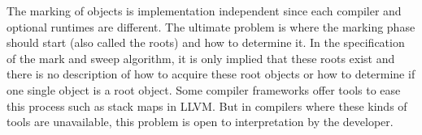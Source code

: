The marking of objects is implementation independent since each compiler and optional runtimes
are different. The ultimate problem is where the marking phase should start (also called
the roots) and how to determine it. In the specification of the mark and sweep algorithm, it is
only implied that these roots exist and there is no description of how to acquire these root
objects or how to determine if one single object is a root object.\cite[p.~19]{gcollHandbook}
Some compiler frameworks offer tools to ease this process such as stack maps in
LLVM.\cite{llvmStackMaps} But in compilers where these kinds of tools are unavailable,
this problem is open to interpretation by the developer.